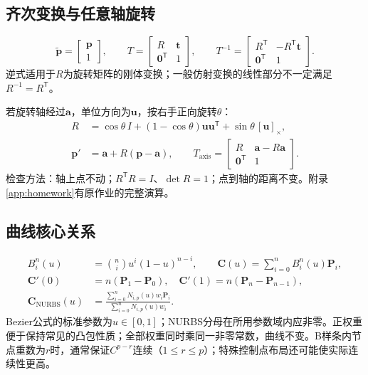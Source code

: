 \subsection*{齐次变换与任意轴旋转}
\[
\widetilde{\boldsymbol p}=\begin{bmatrix}\boldsymbol p\\1\end{bmatrix},\qquad
T=\begin{bmatrix}R&\boldsymbol t\\\boldsymbol0^{\mathsf T}&1\end{bmatrix},\qquad
T^{-1}=\begin{bmatrix}R^{\mathsf T}&-R^{\mathsf T}\boldsymbol t\\\boldsymbol0^{\mathsf T}&1\end{bmatrix}.
\]
逆式适用于$R$为旋转矩阵的刚体变换；一般仿射变换的线性部分不一定满足$R^{-1}=R^{\mathsf T}$。

若旋转轴经过$\boldsymbol a$，单位方向为$\boldsymbol u$，按右手正向旋转$\theta$：
\begin{align*}
R&=\cos\theta\,I+(1-\cos\theta)\boldsymbol u\boldsymbol u^{\mathsf T}
 +\sin\theta\,[\boldsymbol u]_\times,\\
\boldsymbol p'&=\boldsymbol a+R(\boldsymbol p-\boldsymbol a),\qquad
T_{\mathrm{axis}}=\begin{bmatrix}R&\boldsymbol a-R\boldsymbol a\\\boldsymbol0^{\mathsf T}&1\end{bmatrix}.
\end{align*}
检查方法：轴上点不动；$R^{\mathsf T}R=I$、$\det R=1$；点到轴的距离不变。附录\ref{app:homework}有原作业的完整演算。

\subsection*{曲线核心关系}
\begin{align*}
B_i^n(u)&=\binom ni u^i(1-u)^{n-i},\qquad
\boldsymbol C(u)=\sum_{i=0}^nB_i^n(u)\boldsymbol P_i,\\
\boldsymbol C'(0)&=n(\boldsymbol P_1-\boldsymbol P_0),\quad
\boldsymbol C'(1)=n(\boldsymbol P_n-\boldsymbol P_{n-1}),\\
\boldsymbol C_{\mathrm{NURBS}}(u)&=
\frac{\sum_{i=0}^nN_{i,p}(u)w_i\boldsymbol P_i}
 {\sum_{i=0}^nN_{i,p}(u)w_i}.
\end{align*}
Bezier公式的标准参数为$u\in[0,1]$；NURBS分母在所用参数域内应非零。正权重便于保持常见的凸包性质；全部权重同时乘同一非零常数，曲线不变。B样条内节点重数为$r$时，通常保证$C^{p-r}$连续（$1\leq r\leq p$）；特殊控制点布局还可能使实际连续性更高。

